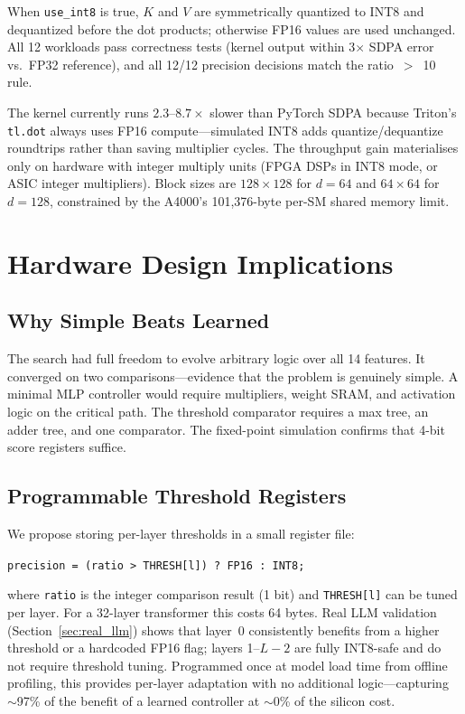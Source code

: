 \documentclass[10pt,twocolumn]{article}
\begin{document}
When \texttt{use\_int8} is true, $K$ and $V$ are symmetrically
quantized to INT8 and dequantized before the dot products; otherwise
FP16 values are used unchanged. All 12 workloads pass correctness
tests (kernel output within 3$\times$ SDPA error vs.\ FP32 reference),
and all 12/12 precision decisions match the ratio~$>$~10 rule.

The kernel currently runs $2.3$--$8.7\times$ slower than PyTorch SDPA
because Triton's \texttt{tl.dot} always uses FP16 compute---simulated
INT8 adds quantize/dequantize roundtrips rather than saving multiplier
cycles. The throughput gain materialises only on hardware with integer
multiply units (FPGA DSPs in INT8 mode, or ASIC integer multipliers).
Block sizes are $128\times128$ for $d=64$ and $64\times64$ for $d=128$,
constrained by the A4000's 101{,}376-byte per-SM shared memory limit.

\section{Hardware Design Implications}

\subsection{Why Simple Beats Learned}

The search had full freedom to evolve arbitrary logic over all 14
features. It converged on two comparisons---evidence that the problem is
genuinely simple. A minimal MLP controller would require multipliers,
weight SRAM, and activation logic on the critical path. The threshold
comparator requires a max tree, an adder tree, and one comparator.
The fixed-point simulation confirms that 4-bit score registers suffice.

\subsection{Programmable Threshold Registers}

We propose storing per-layer thresholds in a small register file:

\smallskip
\noindent\texttt{precision = (ratio > THRESH[l]) ? FP16 : INT8;}
\smallskip

where \texttt{ratio} is the integer comparison result (1 bit) and
\texttt{THRESH[l]} can be tuned per layer. For a 32-layer transformer
this costs 64 bytes. Real LLM validation (Section~\ref{sec:real_llm})
shows that layer~0 consistently benefits from a higher threshold or
a hardcoded FP16 flag; layers 1--$L{-}2$ are fully INT8-safe and do
not require threshold tuning. Programmed once at model load time from
offline profiling, this provides per-layer adaptation with no
additional logic---capturing $\sim$97\% of the benefit of a learned
controller at $\sim$0\% of the silicon cost.
\end{document}
